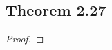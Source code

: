 \documentclass[../../main.tex]{subfiles}
\begin{document}
\subsection{Theorem 2.27}
\begin{wts}

\end{wts}
\begin{proof}

\end{proof}
\end{document}
